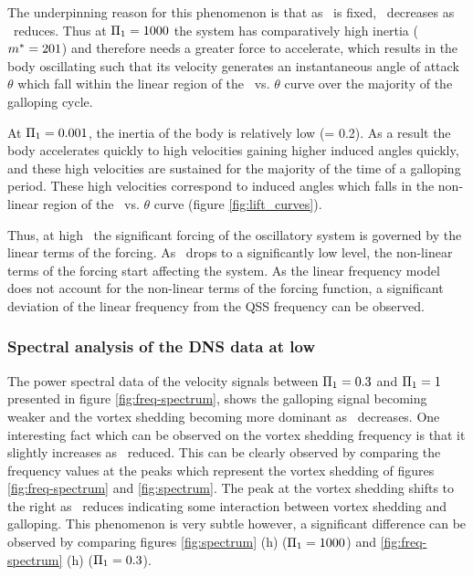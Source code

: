 The underpinning reason for this phenomenon is that as \massdamp\ is fixed, \mstar\ decreases as \massstiff\ reduces. Thus at $\Pi_1=1000$ the system has comparatively high inertia ($m^{*}=201$) and therefore needs a greater force to accelerate, which results in the body oscillating such that its velocity generates an instantaneous angle of attack  $\theta$ which fall within the linear region of the \cy\ vs. $\theta$ curve over the majority of the galloping cycle.

 At $\Pi_1=0.001$, the inertia of the body is relatively low (\mstar= 0.2). As a result the body accelerates quickly to high velocities gaining higher induced angles quickly, and these high velocities are sustained for the majority of the time of a galloping period. These high velocities correspond to induced angles which falls in the non-linear  region of the \cy\ vs. $\theta$ curve (figure \ref{fig:lift_curves}). 

 Thus, at high \massstiff\, the significant forcing of the oscillatory system is governed by the linear terms of the forcing. As \massstiff\ drops to a significantly low level, the non-linear terms of the forcing start affecting the system. As the linear frequency model does not account for the non-linear terms of the forcing function, a significant deviation of the linear frequency from the QSS frequency can be observed.
\subsubsection{Spectral analysis of the DNS data at low \massstiff}
\label{subsec:freq-spectrum}



The power spectral data of the velocity signals between $\Pi_1=0.3$ and $\Pi_1=1$ presented in figure \ref{fig:freq-spectrum}, shows the galloping signal becoming weaker and the vortex shedding becoming more dominant as \massstiff\ decreases. One interesting fact which can be observed on the vortex shedding frequency is that it slightly increases as \massstiff\ reduced. This can be clearly observed by comparing the frequency values at the peaks which represent the vortex shedding of figures \ref{fig:freq-spectrum} and \ref{fig:spectrum}. The peak at the vortex shedding shifts to the right as \massstiff\ reduces indicating some interaction between vortex shedding and galloping. This phenomenon is very subtle however, a significant difference can be observed by comparing figures \ref{fig:spectrum} (h) ($\Pi_1=1000$) and  \ref{fig:freq-spectrum} (h) ($\Pi_1=0.3$).


